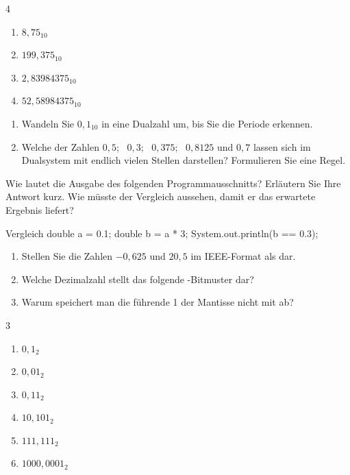 \begin{multicols}{4}
\begin{enumerate}[label=\alph*)]
\item $8{,}75_{10}$
\item $199{,}375_{10}$
\item $2{,}83984375_{10}$
\item $52{,}58984375_{10}$
\end{enumerate}
\end{multicols}

\begin{enumerate}[label=\alph*)]
\item Wandeln Sie $0{,}1_{10}$ in eine Dualzahl um, bis Sie die Periode erkennen.
\item Welche der Zahlen $0{,}5$; \ $0{,}3$; \ $0{,}375$; \ $0{,}8125$ und $0{,}7$ lassen sich im Dualsystem mit endlich vielen Stellen darstellen? Formulieren Sie eine Regel.
\end{enumerate}

Wie lautet die Ausgabe des folgenden Programmausschnitts? Erläutern Sie Ihre Antwort kurz. Wie müsste der Vergleich aussehen, damit er das erwartete Ergebnis liefert?
\begin{javacode}[Ausschnitt]{Vergleich}
double a = 0.1;
double b = a * 3;
System.out.println(b == 0.3);
\end{javacode}

\begin{enumerate}[label=\alph*)]
\item Stellen Sie die Zahlen $-0{,}625$ und $20{,}5$ im IEEE-Format als  dar.
\item Welche Dezimalzahl stellt das folgende -Bitmuster dar?
\begin{center}
\end{center}
\item Warum speichert man die führende 1 der Mantisse nicht mit ab?
\end{enumerate}

\ueben
{}
\begin{multicols}{3}
\begin{enumerate}[label=\alph*)]
\item $0{,}1_2$
\item $0{,}01_2$
\item $0{,}11_2$
\item $10{,}101_2$
\item $111{,}111_2$
\item $1000{,}0001_2$
\end{enumerate}
\end{multicols}

